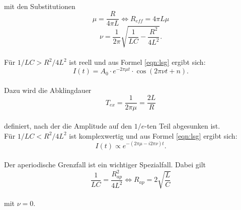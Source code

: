 \\mit den Substitutionen
\begin{equation}
  \mu = \frac{R}{4 \pi L} \Leftrightarrow R_{eff}= 4 \pi L \mu
  \label{eqn:mu}
\end{equation}
\begin{equation*}
  \nu = \frac{1}{2 \pi} \sqrt{\frac{1}{LC} - \frac{R^2}{4 L^2}}.
\end{equation*}
\\Für $1/LC > R^2/4L^2$ ist \nu reell und aus Formel \eqref{eqn:lsg} ergibt sich:
\begin{equation*}
  I(t)= A_{0} \cdot e^{-2 \pi \mu t} \cdot \cos{(2 \pi \nu t + n)}.
\end{equation*}
\\Dazu wird die Abklingdauer
\begin{equation}
  T_{ex} = \frac{1}{2 \pi \mu} = \frac{2L}{R}
  \label{eqn:tex}
\end{equation}
\\definiert, nach der die Amplitude auf den $1/e$-ten Teil abgesunken ist.
\\Für $1/LC < R^2/4L^2$ ist \nu komplexwertig und aus Formel \eqref{eqn:lsg} ergibt sich:
\begin{equation*}
  I(t) \propto e^{-(2 \pi \mu - i 2 \pi \nu) t}.
\end{equation*}
\\Der aperiodische Grenzfall ist ein wichtiger Spezialfall.
Dabei gilt
\begin{equation}
  \frac{1}{LC} = \frac{R_{ap}^2}{4 L^2} \Leftrightarrow R_{ap} = 2 \sqrt{\frac{L}{C}}
  \label{eqn:rap}
\end{equation}
\\mit $\nu=0$.

